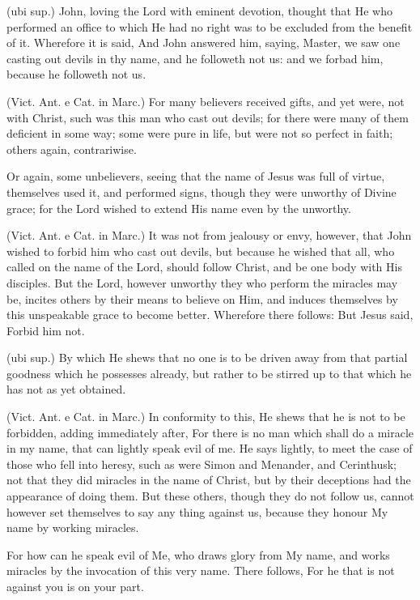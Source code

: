  (ubi sup.) John, loving the Lord with eminent devotion, thought that He who performed an office to which He had no right was to be excluded from the benefit of it. Wherefore it is said, And John answered him, saying, Master, we saw one casting out devils in thy name, and he followeth not us: and we forbad him, because he followeth not us.

 (Vict. Ant. e Cat. in Marc.) For many believers received gifts, and yet were, not with Christ, such was this man who cast out devils; for there were many of them deficient in some way; some were pure in life, but were not so perfect in faith; others again, contrariwise.

 Or again, some unbelievers, seeing that the name of Jesus was full of virtue, themselves used it, and performed signs, though they were unworthy of Divine grace; for the Lord wished to extend His name even by the unworthy.

 (Vict. Ant. e Cat. in Marc.) It was not from jealousy or envy, however, that John wished to forbid him who cast out devils, but because he wished that all, who called on the name of the Lord, should follow Christ, and be one body with His disciples. But the Lord, however unworthy they who perform the miracles may be, incites others by their means to believe on Him, and induces themselves by this unspeakable grace to become better. Wherefore there follows: But Jesus said, Forbid him not.

 (ubi sup.) By which He shews that no one is to be driven away from that partial goodness which he possesses already, but rather to be stirred up to that which he has not as yet obtained.

 (Vict. Ant. e Cat. in Marc.) In conformity to this, He shews that he is not to be forbidden, adding immediately after, For there is no man which shall do a miracle in my name, that can lightly speak evil of me. He says lightly, to meet the case of those who fell into heresy, such as were Simon and Menander, and Cerinthusk; not that they did miracles in the name of Christ, but by their deceptions had the appearance of doing them. But these others, though they do not follow us, cannot however set themselves to say any thing against us, because they honour My name by working miracles.

 For how can he speak evil of Me, who draws glory from My name, and works miracles by the invocation of this very name. There follows, For he that is not against you is on your part.

